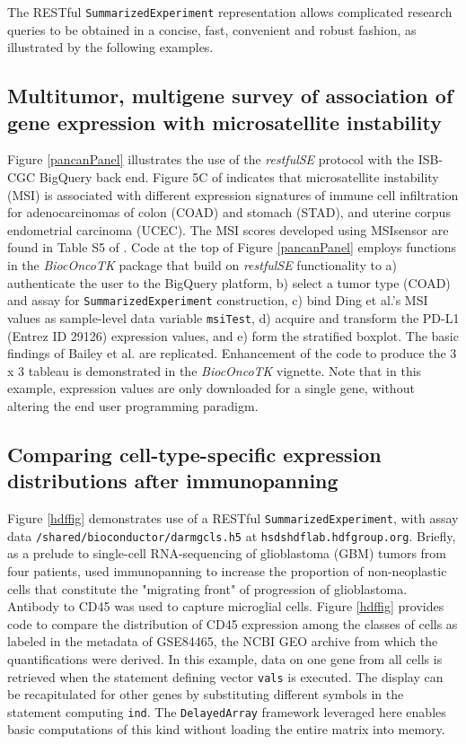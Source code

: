 \documentclass[applications]{gen-bioinformatics}
\newcommand{\Biocpackage}[1]{{\textit{#1}}}
\newcommand{\BiocpackageFirst}[1]{{\textit{#1}}}
\begin{document}
The RESTful \texttt{SummarizedExperiment} representation
allows complicated research queries to be obtained in a concise,
fast, convenient and robust fashion, as illustrated by
the following examples.


\subsection*{Multitumor, multigene survey of association
of gene expression with microsatellite instability}

Figure \ref{pancanPanel} illustrates the 
use of the \Biocpackage{restfulSE} protocol
with the ISB-CGC BigQuery back end.  Figure 5C
of \citet{Bailey2018} indicates that
microsatellite instability (MSI) is associated with
different expression signatures of immune cell infiltration
for adenocarcinomas of colon (COAD) and stomach (STAD), and
uterine corpus endometrial carcinoma (UCEC).  
The MSI scores developed using MSIsensor are found
in Table S5 of \cite{Ding2018}.
Code at the top of Figure \ref{pancanPanel} employs
functions in the \BiocpackageFirst{BiocOncoTK} \citep{bionc} package that build on
\Biocpackage{restfulSE} functionality to a) authenticate the
user to the BigQuery platform, b) select a tumor
type (COAD) and assay for \texttt{SummarizedExperiment}
construction, c) bind Ding et al.'s MSI values as
sample-level data variable \verb+msiTest+, d)
acquire and transform the PD-L1 
(Entrez ID 29126)
expression values, and e) form the stratified boxplot. 
The basic findings of Bailey et al. are replicated.
Enhancement of the code to produce the 3 x 3 tableau
is demonstrated in the \Biocpackage{BiocOncoTK} \citep{bionc} vignette.
Note that in this example, expression values are
only downloaded for a single gene, without altering
the end user programming paradigm.



\subsection*{Comparing cell-type-specific 
expression distributions after immunopanning}

Figure \ref{hdffig}
demonstrates use of a RESTful \texttt{SummarizedExperiment},
with assay data \texttt{/shared/bioconductor/darmgcls.h5}
at \texttt{hsdshdflab.hdfgroup.org}.  Briefly, as a
prelude to single-cell RNA-sequencing of glioblastoma (GBM)
tumors from four patients,
\cite{Darmanis2017} used immunopanning to increase the
proportion of non-neoplastic cells that constitute
the "migrating front" of progression of glioblastoma.
Antibody to CD45 was used to capture microglial cells.
Figure \ref{hdffig} provides code to compare
the distribution of CD45 expression among the
classes of
cells as labeled in the metadata of GSE84465,
the NCBI GEO archive from which the quantifications
were derived.  
In this example, data on one
gene from all cells
is retrieved when the statement defining vector \texttt{vals}
is executed.  The display can be recapitulated for
other genes by substituting different symbols in
the statement computing \texttt{ind}.
The \verb+DelayedArray+ framework leveraged here
enables basic computations of this kind without loading the
entire matrix into memory.
\end{document}
